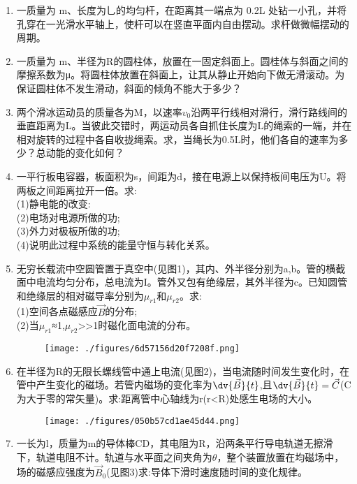 \begin{enumerate}
\item 一质量为 m、长度为乚的均匀杆，在距离其一端点为 0.2L 处钻一小孔，并将孔穿在一光滑水平轴上，使杆可以在竖直平面内自由摆动。求杆做微幅摆动的周期。
\item 一质量为 m、半径为R的圆柱体，放置在一固定斜面上。圆桂体与斜面之间的摩擦系数为μ。将圆柱体放置在斜面上，让其从静止开始向下做无滑滚动。为保证圆柱体不发生滑动，斜面的倾角不能大于多少？
\item 两个滑冰运动员的质量各为M，以速率$v_0$沿两平行线相对滑行，滑行路线间的垂直距离为L。当彼此交错时，两运动员各自抓住长度为L的绳索的一端，并在相对旋转的过程中各自收拢绳索。求，当绳长为0.5L时，他们各自的速率为多少？总动能的变化如何？
\item 一平行板电容器，板面积为s，间距为d，接在电源上以保持板间电压为U。将两板之间距离拉开一倍。求:\\(1)静电能的改变:\\(2)电场对电源所做的功;\\(3)外力对极板所做的功;\\(4)说明此过程中系统的能量守恒与转化关系。
\item 无穷长载流中空圆管置于真空中(见图1)，其内、外半径分别为a,b。管的横截面中电流均匀分布，总电流为I。管外又包有绝缘层，其外半径为c。已知圆管和绝缘层的相对磁导率分别为$\mu_{r1}$和$\mu_{r2}$。求:\\
(1)空间各点磁感应$\vec B$的分布;\\
(2)当$\mu_{r1}$≈1,$\mu_{r2}$>>1时磁化面电流的分布。
\begin{figure}[ht]
\centering
\texttt{[image: ./figures/6d57156d20f7208f.png]}
\caption{} \label{fig_SSD05_2}
\end{figure}
\item 在半径为R的无限长螺线管中通上电流(见图2)，当电流随时间发生变化时，在管中产生变化的磁场。若管内磁场的变化率为$\displaystyle \dv{\vec B}{t}$,且$\displaystyle \dv{\vec B}{t}=\vec C$(\vec C为大于零的常矢量)。求:距离管中心轴线为r(r<R)处感生电场的大小。
\begin{figure}[ht]
\centering
\texttt{[image: ./figures/050b57cd1ae45d44.png]}
\caption{} \label{fig_SSD05_4}
\end{figure}
\item 一长为l，质量为m的导体棒CD，其电阻为R，沿两条平行导电轨道无擦滑下，轨道电阻不计。轨道与水平面之间夹角为$\theta $，整个装置放置在均磁场中，场的磁感应强度为$\vec B_0$(见图3)求:导体下滑时速度随时间的变化规律。

\end{enumerate}
